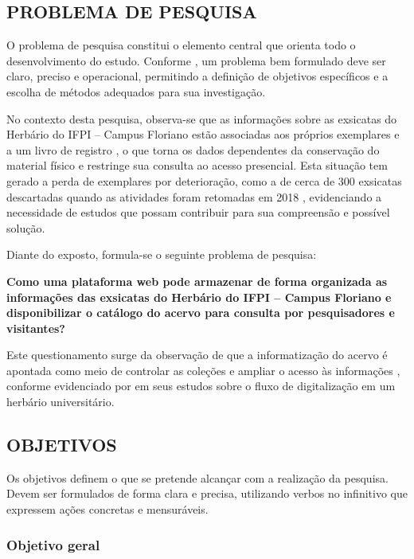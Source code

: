 \documentclass[
    12pt,        %
    openany,     %
    oneside,     %
    a4paper,     %
    english,     %
    french,      %
    spanish,     %
    brazil,      %
    article      %
]{abntex2}
\begin{document}
\subsection{PROBLEMA DE PESQUISA}
\label{subsec:problema}

O problema de pesquisa constitui o elemento central que orienta todo o desenvolvimento do estudo. Conforme , um problema bem formulado deve ser claro, preciso e operacional, permitindo a definição de objetivos específicos e a escolha de métodos adequados para sua investigação.

No contexto desta pesquisa, observa-se que as informações sobre as exsicatas do Herbário do IFPI -- Campus Floriano estão associadas aos próprios exemplares e a um livro de registro \cite{lopes2023herbario}, o que torna os dados dependentes da conservação do material físico e restringe sua consulta ao acesso presencial. Esta situação tem gerado a perda de exemplares por deterioração, como a de cerca de 300 exsicatas descartadas quando as atividades foram retomadas em 2018 \cite{lopes2023herbario}, evidenciando a necessidade de estudos que possam contribuir para sua compreensão e possível solução.

Diante do exposto, formula-se o seguinte problema de pesquisa:

\textbf{Como uma plataforma web pode armazenar de forma organizada as informações das exsicatas do Herbário do IFPI -- Campus Floriano e disponibilizar o catálogo do acervo para consulta por pesquisadores e visitantes?}

Este questionamento surge da observação de que a informatização do acervo é apontada como meio de controlar as coleções e ampliar o acesso às informações \cite{gasper2021digitalizacao,paton2026digitisation}, conforme evidenciado por  em seus estudos sobre o fluxo de digitalização em um herbário universitário.


\subsection{OBJETIVOS}
\label{subsec:objetivos}

Os objetivos definem o que se pretende alcançar com a realização da pesquisa. Devem ser formulados de forma clara e precisa, utilizando verbos no infinitivo que expressem ações concretas e mensuráveis.

\subsubsection{Objetivo geral}
\label{subsubsec:objetivo-geral}
\end{document}
